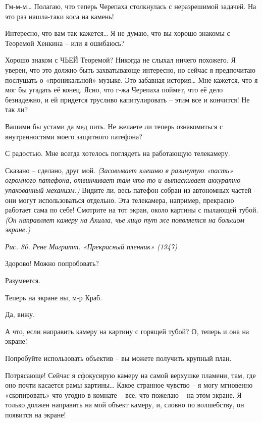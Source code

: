 \documentclass[../main.tex]{subfiles}
\begin{document}
\begin{dialogue}
 Гм-м-м\ldots{} Полагаю, что теперь Черепаха столкнулась с неразрешимой задачей. На это раз нашла-таки коса на камень!

 Интересно, что вам так кажется\ldots{} Я не думаю, что вы хорошо знакомы с Теоремой Хенкина \--- или я ошибаюсь?

 Хорошо знаком с ЧЬЕЙ Теоремой? Никогда не слыхал ничего похожего. Я уверен, что это должно быть захватывающе интересно, но сейчас я предпочитаю послушать о «проникальной» музыке. Это забавная история\ldots{} Мне кажется, что я мог бы угадать её конец. Ясно, что г-жа Черепаха поймет, что её дело безнадежно, и ей придется трусливо капитулировать \--- этим все и кончится! Не так ли?

 Вашими бы устами да мед пить. Не желаете ли теперь ознакомиться с внутренностями моего защитного патефона?

 С радостью. Мне всегда хотелось поглядеть на работающую телекамеру.

 Сказано \--- сделано, друг мой. \emph{(Засовывает клешню в разинутую «пасть» огромного патефона, отвинчивает там что-то и вытаскивает аккуратно упакованный механизм.)} Видите ли, весь патефон собран из автономных частей \--- они могут использоваться отдельно. Эта телекамера, например, прекрасно работает сама по себе! Смотрите на тот экран, около картины с пылающей тубой. \emph{(Он направляет камеру на Ахилла, чье лицо тут же появляется на большом экране.)}

\emph{Рис. 80. Рене Магритт. «Прекрасный пленник» (1947)}

 Здорово! Можно попробовать?

 Разумеется.

 Теперь на экране вы, м-р Краб.

 Да, вижу.

 А что, если направить камеру на картину с горящей тубой? О, теперь и она на экране!

 Попробуйте использовать объектив \--- вы можете получить крупный план.

 Потрясающе! Сейчас я сфокусирую камеру на самой верхушке пламени, там, где оно почти касается рамы картины\ldots{} Какое странное чувство \--- я могу мгновенно «скопировать» что угодно в комнате \--- все, что пожелаю \--- на этом экране. Я только должен направить на мой объект камеру, и, словно по волшебству, он появится на экране!


\end{dialogue}
\end{document}
